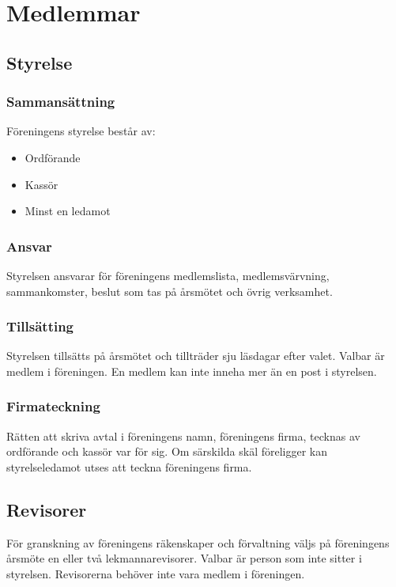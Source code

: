 \section{Medlemmar}

\subsection{Styrelse} \label{sec:sammansättning-styrelse}

\subsubsection{Sammansättning} 

Föreningens styrelse består av:
\begin{itemize}
    \item Ordförande
    \item Kassör
    \item Minst en ledamot
\end{itemize}

\subsubsection{Ansvar}
Styrelsen ansvarar för föreningens medlemslista, medlemsvärvning, sammankomster, beslut som tas på årsmötet och övrig verksamhet.

\subsubsection{Tillsätting}
Styrelsen tillsätts på årsmötet och tillträder sju läsdagar efter valet. Valbar är medlem i föreningen. En medlem kan inte inneha mer än en post i styrelsen.

\subsubsection{Firmateckning}
Rätten att skriva avtal i föreningens namn, föreningens firma, tecknas av ordförande och kassör var för sig. Om särskilda skäl föreligger kan styrelseledamot utses att teckna föreningens firma.




\subsection{Revisorer}
För granskning av föreningens räkenskaper och förvaltning väljs på föreningens årsmöte en eller två lekmannarevisorer. Valbar är person som inte sitter i styrelsen. Revisorerna behöver inte vara medlem i föreningen.



